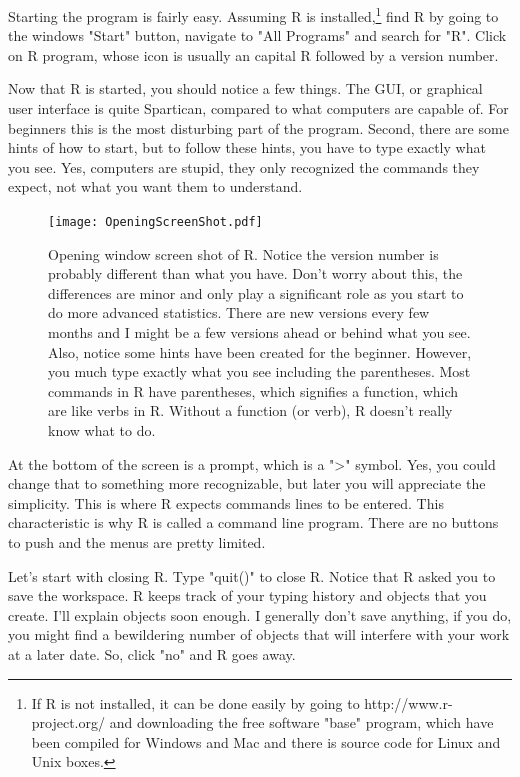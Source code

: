 \documentclass{tufte-handout}\usepackage[]{graphicx}\usepackage[]{xcolor}
\begin{document}
Starting the program is fairly easy. Assuming R is installed,\footnote[][.03in]{If R is not installed, it can be done easily by going to http://www.r-project.org/ and downloading the free software "base" program, which have been compiled for Windows and Mac and there is source code for Linux and Unix boxes.} find R by going to the windows "Start" button, navigate to "All Programs" and search for "R". Click on R program, whose icon is usually an capital R followed by a version number. 

Now that R is started, you should notice a few things.  The GUI, or graphical user interface is quite Spartican, compared to what computers are capable of. For beginners this is the most disturbing part of the program. Second, there are some hints of how to start, but to follow these hints, you have to type exactly what you see. Yes, computers are stupid, they only recognized the commands they expect, not what you want them to understand. 

\begin{figure}
		\texttt{[image: OpeningScreenShot.pdf]}
	\caption{Opening window screen shot of R. Notice the version number is probably different than what you have. Don't worry about this, the differences are minor and only play a significant role as you start to do more advanced statistics. There are new versions every few months and I might be a few versions ahead or behind what you see. Also, notice some hints have been created for the beginner. However, you much type exactly what you see including the parentheses. Most commands in R have parentheses, which signifies a function, which are like verbs in R. Without a function (or verb), R doesn't really know what to do.}
	\label{fig:OpeningScreenShot}
\end{figure}

At the bottom of the screen is a prompt, which is a ">" symbol. Yes, you could change that to something more recognizable, but later you will appreciate the simplicity. This is where R expects commands lines to be entered. This characteristic is why R is called a command line program. There are no buttons to push and the menus are pretty limited.
  
Let's start with closing R.  Type "quit()" to close R. Notice that R asked you to save the workspace. R keeps track of your typing history and objects that you create. I'll explain objects soon enough. I generally don't save anything, if you do, you might find a bewildering number of objects that will interfere with your work at a later date. So, click "no" and R goes away.
\end{document}
